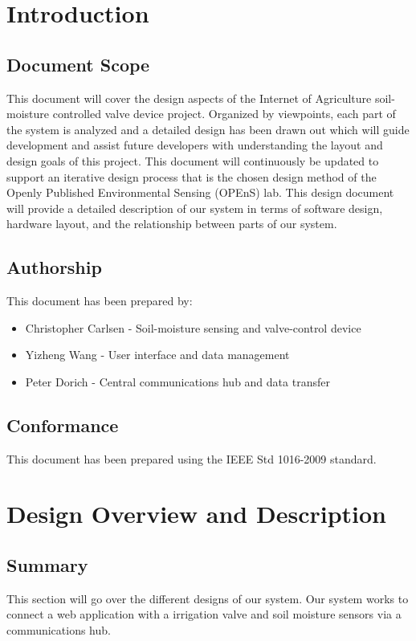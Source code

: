 \documentclass[onecolumn, draftclsnofoot,10pt, compsoc]{IEEEtran}
\begin{document}
	
	\section{Introduction}
	\subsection{Document Scope}
	This document will cover the design aspects of the Internet of Agriculture soil-moisture controlled valve device project.
	Organized by viewpoints, each part of the system is analyzed and a detailed design has been drawn out which will guide development and assist future developers with understanding the layout and design goals of this project. 
	This document will continuously be updated to support an iterative design process that is the chosen design method of the Openly Published Environmental Sensing (OPEnS) lab. 
	This design document will provide a detailed description of our system in terms of software design, hardware layout, and the relationship between parts of our system.
	\subsection{Authorship}
	This document has been prepared by:
	\begin{itemize}
		\item Christopher Carlsen - Soil-moisture sensing and valve-control device
		\item Yizheng Wang - User interface and data management
		\item Peter Dorich - Central communications hub and data transfer
	\end{itemize}
	
	\subsection{Conformance}
	This document has been prepared using the IEEE Std 1016-2009 standard. 
	
	\section{Design Overview and Description}
	\subsection{Summary}
	This section will go over the different designs of our system. 
	Our system works to connect a web application with a irrigation valve and soil moisture sensors via a communications hub.
\end{document}
